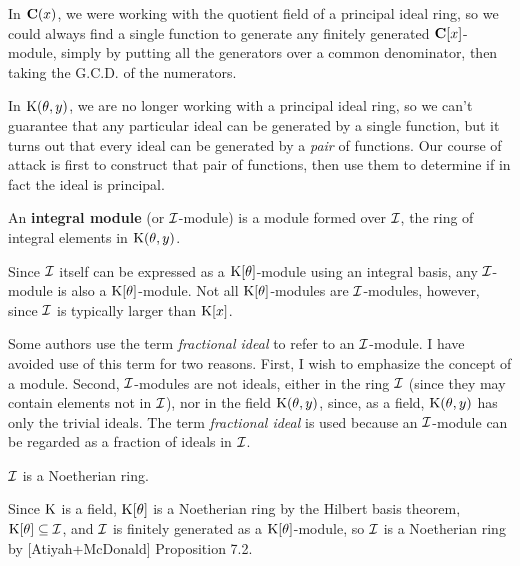 {}

In ${\bf C}(x)$, we were working with the quotient field of a
principal ideal ring, so we could always find a single function to
generate any finitely generated ${\bf C}[x]$-module, simply by putting
all the generators over a common denominator, then taking the
G.C.D. of the numerators.

In ${\rm K}(\theta,y)$, we are no longer working with a principal ideal
ring, so we can't guarantee that any particular ideal can be generated
by a single function, but it turns out that every ideal can be
generated by a {\it pair} of functions.  Our course of attack is first
to construct that pair of functions, then use them to determine if in
fact the ideal is principal.


An {\bf integral module} (or ${\cal I}$-module) is a module formed
over ${\cal I}$, the ring of integral elements in ${\rm K}(\theta,y)$.

\enddefinition

Since ${\cal I}$ itself can be expressed as a ${\rm K}[\theta]$-module
using an integral basis, any ${\cal I}$-module is also a ${\rm
K}[\theta]$-module.  Not all ${\rm K}[\theta]$-modules are ${\cal
I}$-modules, however, since ${\cal I}$ is typically larger than ${\rm
K}[x]$.


Some authors use the term {\it fractional ideal} to refer to an ${\cal
I}$-module.  I have avoided use of this term for two reasons.  First,
I wish to emphasize the concept of a module.  Second, ${\cal
I}$-modules are not ideals, either in the ring ${\cal I}$ (since they
may contain elements not in ${\cal I}$), nor in the field ${\rm
K}(\theta,y)$, since, as a field, ${\rm K}(\theta,y)$ has only the trivial
ideals.  The term {\it fractional ideal} is used because an ${\cal
I}$-module can be regarded as a fraction of ideals in ${\cal I}$.

\theorem ${\cal I}$ is a Noetherian ring.
\label{I is Noetherian}

\proof

Since ${\rm K}$ is a field, ${\rm K}[\theta]$ is a Noetherian ring by
the Hilbert basis theorem, ${\rm K}[\theta] \subseteq {\cal I}$, and
${\cal I}$ is finitely generated as a ${\rm K}[\theta]$-module, so
${\cal I}$ is a Noetherian ring by [Atiyah+McDonald] Proposition 7.2.

